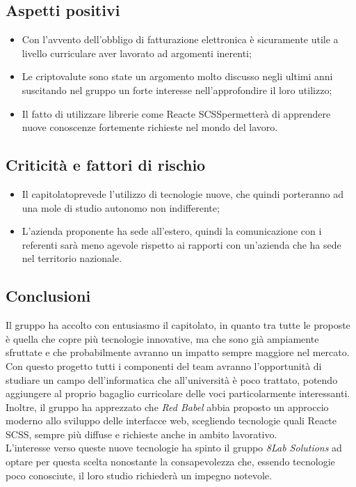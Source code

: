 \subsection{Aspetti positivi}
\begin{itemize}
	\item Con l'avvento dell'obbligo di fatturazione elettronica è sicuramente
	utile a livello curriculare aver lavorato ad argomenti inerenti;
	\item Le criptovalute sono state un argomento molto discusso negli ultimi anni 
suscitando nel gruppo un forte interesse nell'approfondire il loro utilizzo;
	
	\item Il fatto di utilizzare librerie come React\glosp e SCSS\glosp permetterà di
	apprendere nuove conoscenze fortemente richieste nel mondo del lavoro.
\end{itemize}


\subsection{Criticità  e fattori di rischio}

\begin{itemize}
	\item Il capitolato\glosp prevede l'utilizzo di tecnologie nuove, che quindi 
porteranno ad una mole di studio autonomo non indifferente;
	\item L'azienda proponente ha sede all'estero, quindi la comunicazione con i 
referenti sarà meno agevole rispetto ai rapporti con un'azienda che ha sede nel 
territorio nazionale.
\end{itemize}

\subsection{Conclusioni} Il gruppo ha accolto con entusiasmo il capitolato\glo, in 
quanto tra tutte le proposte è quella che copre più tecnologie innovative, ma 
che sono già ampiamente sfruttate e che probabilmente avranno un impatto sempre 
maggiore nel mercato. Con questo progetto tutti i componenti del team avranno 
l'opportunità di studiare un campo dell'informatica che all'università è poco 
trattato, potendo aggiungere al proprio bagaglio curricolare delle voci 
particolarmente interessanti. Inoltre, il gruppo ha apprezzato che \textit{Red Babel} abbia
proposto un approccio moderno allo sviluppo delle interfacce web, scegliendo 
tecnologie quali React\glosp e SCSS\glosp, sempre più diffuse e richieste anche in ambito lavorativo.\\
L'interesse verso queste nuove tecnologie ha spinto il gruppo \textit{8Lab Solutions} ad 
optare per questa scelta nonostante la consapevolezza che, essendo tecnologie 
poco conosciute, il loro studio richiederà un impegno notevole.


